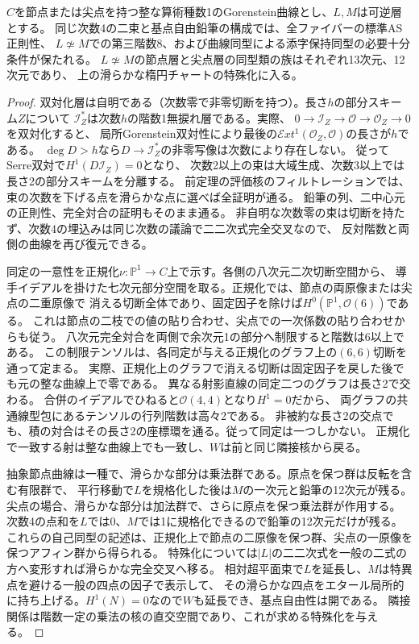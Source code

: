 \begin{theorem}[節点・尖点の整な境界]\label{thm:elliptic-pencil-integral-boundary}
$C$を節点または尖点を持つ整な算術種数1のGorenstein曲線とし、$L,M$は可逆層とする。
同じ次数4の二束と基点自由鉛筆の構成では、全ファイバーの標準AS正則性、
$L\not\simeq M$での第三階数8、および曲線同型による添字保持同型の必要十分条件が保たれる。
$L\not\simeq M$の節点層と尖点層の同型類の族はそれぞれ13次元、12次元であり、
上の滑らかな楕円チャートの特殊化に入る。
\end{theorem}
\begin{proof}
双対化層は自明である（次数零で非零切断を持つ）。長さ$h$の部分スキーム$Z$について
$\mathcal I_Z^*$は次数$h$の階数1無捩れ層である。実際、
$0\to\mathcal I_Z\to\mathcal O\to\mathcal O_Z\to0$を双対化すると、
局所Gorenstein双対性により最後の$\mathcal E xt^1(\mathcal O_Z,\mathcal O)$の長さが$h$である。
$\deg D>h$なら$D\to\mathcal I_Z^*$の非零写像は次数により存在しない。
従ってSerre双対で$H^1(D\mathcal I_Z)=0$となり、
次数2以上の束は大域生成、次数3以上では長さ2の部分スキームを分離する。
前定理の評価核のフィルトレーションでは、束の次数を下げる点を滑らかな点に選べば全証明が通る。
鉛筆の列、二中心元の正則性、完全対合の証明もそのまま通る。
非自明な次数零の束は切断を持たず、次数4の埋込みは同じ次数の議論で二二次式完全交叉なので、
反対階数と両側の曲線を再び復元できる。

同定の一意性を正規化$\nu:\mathbb P^1\to C$上で示す。各側の八次元二次切断空間から、
導手イデアルを掛けた七次元部分空間を取る。正規化では、節点の両原像または尖点の二重原像で
消える切断全体であり、固定因子を除けば$H^0(\mathbb P^1,\mathcal O(6))$である。
これは節点の二枝での値の貼り合わせ、尖点での一次係数の貼り合わせからも従う。
八次元完全対合を両側で余次元1の部分へ制限すると階数は6以上である。
この制限テンソルは、各同定が与える正規化のグラフ上の$(6,6)$切断を通って定まる。
実際、正規化上のグラフで消える切断は固定因子を戻した後でも元の整な曲線上で零である。
異なる射影直線の同定二つのグラフは長さ2で交わる。
合併のイデアルでひねると$\mathcal O(4,4)$となり$H^1=0$だから、
両グラフの共通線型包にあるテンソルの行列階数は高々2である。
非被約な長さ2の交点でも、積の対合はその長さ2の座標環を通る。従って同定は一つしかない。
正規化で一致する射は整な曲線上でも一致し、$W$は前と同じ隣接核から戻る。

抽象節点曲線は一種で、滑らかな部分は乗法群である。原点を保つ群は反転を含む有限群で、
平行移動で$L$を規格化した後は$M$の一次元と鉛筆の12次元が残る。
尖点の場合、滑らかな部分は加法群で、さらに原点を保つ乗法群が作用する。
次数4の点和を$L$では0、$M$では1に規格化できるので鉛筆の12次元だけが残る。
これらの自己同型の記述は、正規化上で節点の二原像を保つ群、尖点の一原像を保つアフィン群から得られる。
特殊化については$|L|$の二二次式を一般の二式の方へ変形すれば滑らかな完全交叉へ移る。
相対超平面束で$L$を延長し、$M$は特異点を避ける一般の四点の因子で表示して、
その滑らかな四点をエタール局所的に持ち上げる。$H^1(N)=0$なので$W$も延長でき、基点自由性は開である。
隣接関係は階数一定の乗法の核の直交空間であり、これが求める特殊化を与える。
\end{proof}

